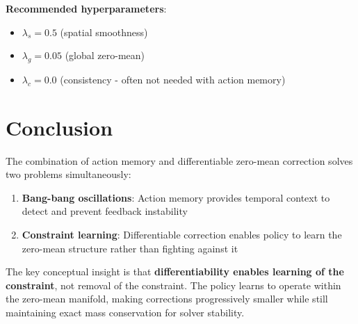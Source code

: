 \documentclass[11pt,a4paper]{article}
\theoremstyle{definition}
\begin{document}
\textbf{Recommended hyperparameters}:
\begin{itemize}
    \item $\lambda_s = 0.5$ (spatial smoothness)
    \item $\lambda_g = 0.05$ (global zero-mean)
    \item $\lambda_c = 0.0$ (consistency - often not needed with action memory)
\end{itemize}

\section{Conclusion}

The combination of action memory and differentiable zero-mean correction solves two problems simultaneously:
\begin{enumerate}
    \item \textbf{Bang-bang oscillations}: Action memory provides temporal context to detect and prevent feedback instability
    \item \textbf{Constraint learning}: Differentiable correction enables policy to learn the zero-mean structure rather than fighting against it
\end{enumerate}

The key conceptual insight is that \textbf{differentiability enables learning of the constraint}, not removal of the constraint. The policy learns to operate within the zero-mean manifold, making corrections progressively smaller while still maintaining exact mass conservation for solver stability.
\end{document}
